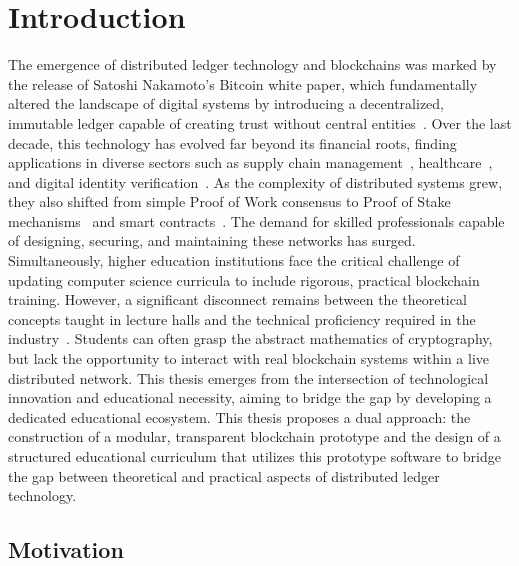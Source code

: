 \chapter*{Introduction}
\label{ch1_introduction}

The emergence of distributed ledger technology and blockchains was marked by the release of Satoshi Nakamoto's Bitcoin white paper, which fundamentally altered the landscape of digital systems by introducing a decentralized, immutable ledger capable of creating trust without central entities~\cite{garay2015bitcoin}. Over the last decade, this technology has evolved far beyond its financial roots, finding applications in diverse sectors such as supply chain management~\cite{rejeb2021logistics}, healthcare~\cite{khezr2019healthcare}, and digital identity verification~\cite{zwitter2020digitalidentity}. As the complexity of distributed systems grew, they also shifted from simple Proof of Work consensus to Proof of Stake mechanisms~\cite{blockchainWithoutWastePos} and smart contracts~\cite{tabatabaei2023understanding}. The demand for skilled professionals capable of designing, securing, and maintaining these networks has surged. Simultaneously, higher education institutions face the critical challenge of updating computer science curricula to include rigorous, practical blockchain training. However, a significant disconnect remains between the theoretical concepts taught in lecture halls and the technical proficiency required in the industry~\cite{transformingEducationBlockchain}. Students can often grasp the abstract mathematics of cryptography, but lack the opportunity to interact with real blockchain systems within a live distributed network. This thesis emerges from the intersection of technological innovation and educational necessity, aiming to bridge the gap by developing a dedicated educational ecosystem. This thesis proposes a dual approach: the construction of a modular, transparent blockchain prototype and the design of a structured educational curriculum that utilizes this prototype software to bridge the gap between theoretical and practical aspects of distributed ledger technology.

\newpage
\section{Motivation} \label{ch1_motivation}

